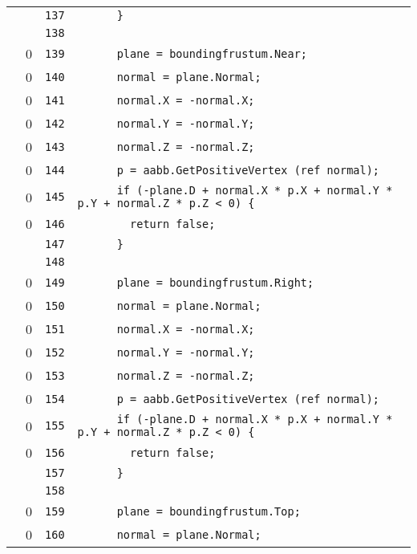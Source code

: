 \documentclass[a4paper,10pt]{article}
\begin{document}
\begin{longtable}[l]{lrrl}
\cellcolor{gray} &  & \verb~137~ & \verb~      }~\\
\cellcolor{gray} &  & \verb~138~ & \verb~~\\
\cellcolor{red} & 0 & \verb~139~ & \verb~      plane = boundingfrustum.Near;~\\
\cellcolor{red} & 0 & \verb~140~ & \verb~      normal = plane.Normal;~\\
\cellcolor{red} & 0 & \verb~141~ & \verb~      normal.X = -normal.X;~\\
\cellcolor{red} & 0 & \verb~142~ & \verb~      normal.Y = -normal.Y;~\\
\cellcolor{red} & 0 & \verb~143~ & \verb~      normal.Z = -normal.Z;~\\
\cellcolor{red} & 0 & \verb~144~ & \verb~      p = aabb.GetPositiveVertex (ref normal);~\\
\cellcolor{red} & 0 & \verb~145~ & \verb~      if (-plane.D + normal.X * p.X + normal.Y * p.Y + normal.Z * p.Z < 0) {~\\
\cellcolor{red} & 0 & \verb~146~ & \verb~        return false;~\\
\cellcolor{gray} &  & \verb~147~ & \verb~      }~\\
\cellcolor{gray} &  & \verb~148~ & \verb~~\\
\cellcolor{red} & 0 & \verb~149~ & \verb~      plane = boundingfrustum.Right;~\\
\cellcolor{red} & 0 & \verb~150~ & \verb~      normal = plane.Normal;~\\
\cellcolor{red} & 0 & \verb~151~ & \verb~      normal.X = -normal.X;~\\
\cellcolor{red} & 0 & \verb~152~ & \verb~      normal.Y = -normal.Y;~\\
\cellcolor{red} & 0 & \verb~153~ & \verb~      normal.Z = -normal.Z;~\\
\cellcolor{red} & 0 & \verb~154~ & \verb~      p = aabb.GetPositiveVertex (ref normal);~\\
\cellcolor{red} & 0 & \verb~155~ & \verb~      if (-plane.D + normal.X * p.X + normal.Y * p.Y + normal.Z * p.Z < 0) {~\\
\cellcolor{red} & 0 & \verb~156~ & \verb~        return false;~\\
\cellcolor{gray} &  & \verb~157~ & \verb~      }~\\
\cellcolor{gray} &  & \verb~158~ & \verb~~\\
\cellcolor{red} & 0 & \verb~159~ & \verb~      plane = boundingfrustum.Top;~\\
\cellcolor{red} & 0 & \verb~160~ & \verb~      normal = plane.Normal;~\\

\end{longtable}
\end{document}
